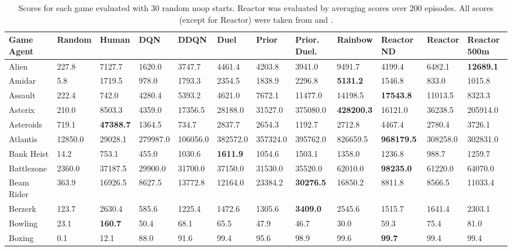 \documentclass{article}
\begin{document}
\begin{table}[h]
\caption{Scores for each game evaluated with 30 random noop starts. Reactor 
was evaluated by averaging scores over 200 episodes. All scores (except for 
Reactor) were taken from \cite{wang2015dueling} and \cite{rainbow}.}
\label{raw-scores-noop}
\begin{scriptsize}
\begin{sc}
\tiny
\clearpage{}\hspace{-40px}\begin{tabular}{| p{2.4cm} p{0.84cm} p{0.84cm} p{0.84cm} p{0.84cm} p{0.84cm} p{0.84cm} p{0.84cm} p{0.84cm} p{0.84cm} p{0.84cm} p{0.84cm} |}
\hline
Game \/ Agent  & Random & Human & DQN & DDQN & Duel & Prior & Prior. Duel. & Rainbow & Reactor ND  & Reactor & Reactor 500m\\
\hline
Alien & 227.8 & 7127.7 & 1620.0 & 3747.7 & 4461.4 & 4203.8 & 3941.0 & 9491.7 & 4199.4 & 6482.1 & {\bf 12689.1}\\
Amidar & 5.8 & 1719.5 & 978.0 & 1793.3 & 2354.5 & 1838.9 & 2296.8 & {\bf 5131.2} & 1546.8 & 833.0 & 1015.8\\
Assault & 222.4 & 742.0 & 4280.4 & 5393.2 & 4621.0 & 7672.1 & 11477.0 & 14198.5 & {\bf 17543.8} & 11013.5 & 8323.3\\
Asterix & 210.0 & 8503.3 & 4359.0 & 17356.5 & 28188.0 & 31527.0 & 375080.0 & {\bf 428200.3} & 16121.0 & 36238.5 & 205914.0\\
Asteroids & 719.1 & {\bf 47388.7} & 1364.5 & 734.7 & 2837.7 & 2654.3 & 1192.7 & 2712.8 & 4467.4 & 2780.4 & 3726.1\\
Atlantis & 12850.0 & 29028.1 & 279987.0 & 106056.0 & 382572.0 & 357324.0 & 395762.0 & 826659.5 & {\bf 968179.5} & 308258.0 & 302831.0\\
Bank Heist & 14.2 & 753.1 & 455.0 & 1030.6 & {\bf 1611.9} & 1054.6 & 1503.1 & 1358.0 & 1236.8 & 988.7 & 1259.7\\
Battlezone & 2360.0 & 37187.5 & 29900.0 & 31700.0 & 37150.0 & 31530.0 & 35520.0 & 62010.0 & {\bf 98235.0} & 61220.0 & 64070.0\\
Beam Rider & 363.9 & 16926.5 & 8627.5 & 13772.8 & 12164.0 & 23384.2 & {\bf 30276.5} & 16850.2 & 8811.8 & 8566.5 & 11033.4\\
Berzerk & 123.7 & 2630.4 & 585.6 & 1225.4 & 1472.6 & 1305.6 & {\bf 3409.0} & 2545.6 & 1515.7 & 1641.4 & 2303.1\\
Bowling & 23.1 & {\bf 160.7} & 50.4 & 68.1 & 65.5 & 47.9 & 46.7 & 30.0 & 59.3 & 75.4 & 81.0\\
Boxing & 0.1 & 12.1 & 88.0 & 91.6 & 99.4 & 95.6 & 98.9 & 99.6 & {\bf 99.7} & 99.4 & 99.4\\

\end{tabular}
\end{sc}
\end{scriptsize}
\end{table}
\end{document}
